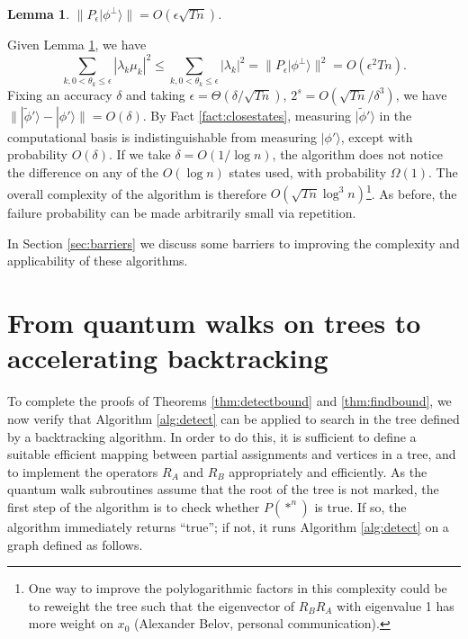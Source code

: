 \documentclass[11pt]{article}
\newcommand{\ket}[1]{| #1 \rangle}
\newtheorem{lem}[thm]{Lemma}
\begin{document}
\begin{lem}
\label{lem:lowepsbound}
$\|P_\epsilon \ket{\phi^\perp} \| = O(\epsilon \sqrt{Tn})$.
\end{lem}

Given Lemma \ref{lem:lowepsbound}, we have
%
\[ \sum_{k,0<\theta_k \le \epsilon} |\lambda_k \mu_k|^2 \le \sum_{k,0<\theta_k \le \epsilon} |\lambda_k|^2 = \|P_\epsilon \ket{\phi^\perp}\|^2 = O(\epsilon^2 Tn). \] 
%
Fixing an accuracy $\delta$ and taking $\epsilon = \Theta(\delta/\sqrt{Tn})$, $2^s = O(\sqrt{Tn}/\delta^3)$, we have $\| \ket{\widetilde{\phi}'} - \ket{\phi'} \| = O(\delta)$. By Fact \ref{fact:closestates}, measuring $\ket{\widetilde{\phi}'}$ in the computational basis is indistinguishable from measuring $\ket{\phi'}$, except with probability $O(\delta)$. If we take $\delta = O(1/\log n)$, the algorithm does not notice the difference on any of the $O(\log n)$ states used, with probability $\Omega(1)$. The overall complexity of the algorithm is therefore $O(\sqrt{Tn} \log^3 n)$\footnote{One way to improve the polylogarithmic factors in this complexity could be to reweight the tree such that the eigenvector of $R_B R_A$ with eigenvalue 1 has more weight on $x_0$ (Alexander Belov, personal communication).}. As before, the failure probability can be made arbitrarily small via repetition.

In Section \ref{sec:barriers} we discuss some barriers to improving the complexity and applicability of these algorithms.


\section{From quantum walks on trees to accelerating backtracking}
\label{sec:walkbacktrack}

To complete the proofs of Theorems \ref{thm:detectbound} and \ref{thm:findbound}, we now verify that Algorithm \ref{alg:detect}  can be applied to search in the tree defined by a backtracking algorithm. In order to do this, it is sufficient to define a suitable efficient mapping between partial assignments and vertices in a tree, and to implement the operators $R_A$ and $R_B$ appropriately and efficiently. As the quantum walk subroutines assume that the root of the tree is not marked, the first step of the algorithm is to check whether $P(\ast^n)$ is true. If so, the algorithm immediately returns ``true''; if not, it runs Algorithm \ref{alg:detect} on a graph defined as follows.
\end{document}
